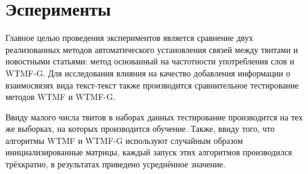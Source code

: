 \section{Эсперименты}
    Главное целью проведения экспериментов является сравнение двух реализованных методов автоматического установления связей между твитами и новостными статьями:
    метод основанный на частотности употребления слов и WTMF-G.
    Для исследования влияния на качество добавления информации о взаимосвязях вида текст-текст также производится сравнительное тестирование методов WTMF и WTMF-G.

    Ввиду малого числа твитов в наборах данных тестирование производится на тех же выборках, на которых производится обучение. Также, ввиду того, что алгоритмы WTMF и WTMF-G используют случайным образом инициализированные матрицы, каждый запуск этих алгоритмов производился трёхкратно, в результатах приведено усреднённое значение.

    
    
    
    


